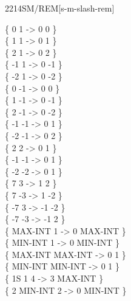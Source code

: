 \begin{worddef}{2214}{SM/REM}[s-m-slash-rem]
\begin{defer}
	\testing
		\{       0              1  ->  0       0 \} \\
		\{       1              1  ->  0       1 \} \\
		\{       2              1  ->  0       2 \} \\
		\{      -1              1  ->  0      -1 \} \\
		\{      -2              1  ->  0      -2 \} \\
		\{       0             -1  ->  0       0 \} \\
		\{       1             -1  ->  0      -1 \} \\
		\{       2             -1  ->  0      -2 \} \\
		\{      -1             -1  ->  0       1 \} \\
		\{      -2             -1  ->  0       2 \} \\
		\{       2              2  ->  0       1 \} \\
		\{      -1             -1  ->  0       1 \} \\
		\{      -2             -2  ->  0       1 \} \\
		\{       7              3  ->  1       2 \} \\
		\{       7             -3  ->  1      -2 \} \\
		\{      -7              3  -> -1      -2 \} \\
		\{      -7             -3  -> -1       2 \} \\
		\{ MAX-INT              1  ->  0 MAX-INT \} \\
		\{ MIN-INT              1  ->  0 MIN-INT \} \\
		\{ MAX-INT        MAX-INT  ->  0       1 \} \\
		\{ MIN-INT        MIN-INT  ->  0       1 \} \\
		\{      1S       1                 4  ->  3 MAX-INT \} \\
		\{       2 MIN-INT        2  ->  0 MIN-INT \} \\

\end{defer}
\end{worddef}
